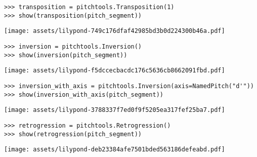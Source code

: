 \begin{comment}
<abjad>
transposition = pitchtools.Transposition(1)
show(transposition(pitch_segment))
</abjad>
\end{comment}

\begin{abjadbookoutput}
\begin{singlespacing}
\vspace{-0.5\baselineskip}
\begin{lstlisting}
>>> transposition = pitchtools.Transposition(1)
>>> show(transposition(pitch_segment))
\end{lstlisting}
\noindent\texttt{[image: assets/lilypond-749c176dfaf42985bd3b0d224300b46a.pdf]}
\end{singlespacing}
\end{abjadbookoutput}

\begin{comment}
<abjad>
inversion = pitchtools.Inversion()
show(inversion(pitch_segment))
inversion_with_axis = pitchtools.Inversion(axis=NamedPitch("d'"))
show(inversion_with_axis(pitch_segment))
</abjad>
\end{comment}

\begin{abjadbookoutput}
\begin{singlespacing}
\vspace{-0.5\baselineskip}
\begin{lstlisting}
>>> inversion = pitchtools.Inversion()
>>> show(inversion(pitch_segment))
\end{lstlisting}
\noindent\texttt{[image: assets/lilypond-f5dccecbacdc176c5636cb8662091fbd.pdf]}
\begin{lstlisting}
>>> inversion_with_axis = pitchtools.Inversion(axis=NamedPitch("d'"))
>>> show(inversion_with_axis(pitch_segment))
\end{lstlisting}
\noindent\texttt{[image: assets/lilypond-3788337f7ed0f9f5205ea317fef25ba7.pdf]}
\end{singlespacing}
\end{abjadbookoutput}

\begin{comment}
<abjad>
retrogression = pitchtools.Retrogression()
show(retrogression(pitch_segment))
</abjad>
\end{comment}

\begin{abjadbookoutput}
\begin{singlespacing}
\vspace{-0.5\baselineskip}
\begin{lstlisting}
>>> retrogression = pitchtools.Retrogression()
>>> show(retrogression(pitch_segment))
\end{lstlisting}
\noindent\texttt{[image: assets/lilypond-deb23384afe7501bded563186defeabd.pdf]}
\end{singlespacing}
\end{abjadbookoutput}

